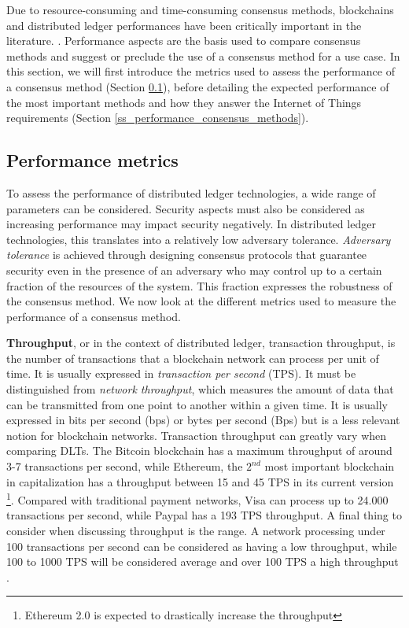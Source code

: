 Due to resource-consuming and time-consuming consensus methods, blockchains and distributed ledger performances have been critically important in the literature. \cite{Brotsis2021, Fan2021, Chen2022, Okegbile2022}. 
Performance aspects are the basis used to compare consensus methods and suggest or preclude the use of a consensus method for a use case. In this section, we will first introduce the metrics used to assess the performance of a consensus method (Section \ref{ss_performance_metrics}), before detailing the expected performance of the most important methods and how they answer the Internet of Things requirements (Section \ref{ss_performance_consensus_methods}). 


\subsection{Performance metrics}
\label{ss_performance_metrics}

To assess the performance of distributed ledger technologies, a wide range of parameters can be considered. Security aspects must also be considered as increasing performance may impact security negatively. In distributed ledger technologies, this translates into a relatively low adversary tolerance. \emph{Adversary tolerance} is achieved through designing consensus protocols that guarantee security even in the presence of an adversary who may control up to a certain fraction of the resources of the system. This fraction expresses the robustness of the consensus method. We now look at the different metrics used to measure the performance of a consensus method.

\textbf{Throughput}, or in the context of distributed ledger, transaction throughput, is the number of transactions that a blockchain network can process per unit of time. It is usually expressed in \emph{transaction per second} (TPS). It must be distinguished from \emph{network throughput}, which measures the amount of data that can be transmitted from one point to another within a given time. It is usually expressed in bits per second (bps) or bytes per second (Bps) but is a less relevant notion for blockchain networks. Transaction throughput can greatly vary when comparing DLTs. The Bitcoin blockchain has a maximum throughput of around 3-7 transactions per second, while Ethereum, the $2^{nd}$ most important blockchain in capitalization has a throughput between 15 and 45 TPS in its current version \footnote{Ethereum 2.0 is expected to drastically increase the throughput}. Compared with traditional payment networks, Visa can process up to 24.000 transactions per second, while Paypal has a 193 TPS throughput. A final thing to consider when discussing throughput is the range. A network processing under 100 transactions per second can be considered as having a low throughput, while 100 to 1000 TPS will be considered average and over 100 TPS a high throughput \cite{Salimitari2020}.


